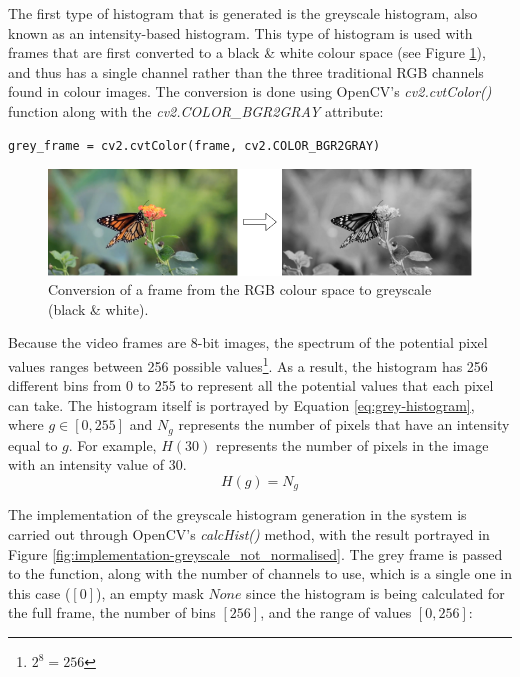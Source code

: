 The first type of histogram that is generated is the greyscale histogram, also known as an intensity-based histogram. This type of histogram is used with frames that are first converted to a black \& white colour space (see Figure \ref{fig:rgb_to_greyscale}), and thus has a single channel rather than the three traditional RGB channels found in colour images. The conversion is done using OpenCV's \textit{cv2.cvtColor()} function along with the \textit{cv2.COLOR\_BGR2GRAY} attribute: 

\begin{lstlisting}[numbers=none]
grey_frame = cv2.cvtColor(frame, cv2.COLOR_BGR2GRAY)
\end{lstlisting}

\begin{figure}[h] 
\centerline{\includegraphics[width=\textwidth]{figures/implementation/rgb_to_greyscale.png}}
\caption{\label{fig:rgb_to_greyscale}Conversion of a frame from the RGB colour space to greyscale (black \& white).}
\end{figure}

Because the video frames are 8-bit images, the spectrum of the potential pixel values ranges between 256 possible values\footnote{$2^8=256$}. As a result, the histogram has 256 different bins from 0 to 255 to represent all the potential values that each pixel can take. The histogram itself is portrayed by Equation \ref{eq:grey-histogram}, where $g\in [0, 255]$ and $N_g$ represents the number of pixels that have an intensity equal to $g$. For example, $H(30)$ represents the number of pixels in the image with an intensity value of 30.
\begin{equation}
\label{eq:grey-histogram}
    H(g)=N_g
\end{equation}

The implementation of the greyscale histogram generation in the system is carried out through OpenCV's \textit{calcHist()} method, with the result portrayed in Figure \ref{fig:implementation-greyscale_not_normalised}. The grey frame is passed to the function, along with the number of channels to use, which is a single one in this case ($[0]$), an empty mask $None$ since the histogram is being calculated for the full frame, the number of bins $[256]$, and the range of values $[0, 256]$:

